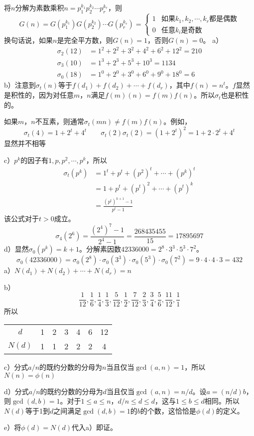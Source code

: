 将$n$分解为素数乘积$n=p_1^{k_1}p_2^{k_2}\cdots p_r^{k_r}$，则
\[G(n)=G(p_1^{k_1})G(p_2^{k_2})\cdots G(p_r^{k_r})=
\begin{cases}  
1 & \text{如果$k_1,k_2,\cdots,k_r$都是偶数} \\
0 & \text{任意$k_i$是奇数}
\end{cases}\]
换句话说，如果$n$是完全平方数，则$G(n)=1$，否则$G(n)=0$。
%
\exercise a）
\begin{align*}
\sigma_2(12)&=1^2+2^2+3^2+4^2+6^2+12^2=210\\
\sigma_3(10)&=1^3+2^3+5^3+10^3=1134\\
\sigma_0(18)&=1^0+2^0+3^0+6^0+9^0+18^0=6
\end{align*}
b）注意到$\sigma_t(n)$等于$f(d_1)+f(d_2)+\cdots+f(d_r)$，其中$f(n)=n^t$。$f$显然是积性的，因为对任意$m$，$n$满足$f(m)(n)=f(m)f(n)$。所以$\sigma_t$也是积性的。\par
如果$m$，$n$不互素，则通常$\sigma_t(mn)\not=f(m)f(n)$。例如，
\[\sigma_t(4)=1+2^t+4^t\qquad \sigma_t(2)\sigma_t(2)=(1+2^t)^2=1+2\cdot2^t+4^t\]
显然并不相等\par
c）$p^k$的因子有$1,p,p^2,\cdots,p^k$，所以
\begin{align*}
\sigma_t(p^k)&=1^t+p^t+(p^2)^t+\cdots+(p^k)^t \\
&=1+p^t+(p^t)^2+\cdots+(p^t)^k\\
&=\frac{(p^t)^{k+1}-1}{p^t-1}
\end{align*}
该公式对于$t>0$成立。
\[\sigma_4(2^6)=\frac{(2^4)^7-1}{2^4-1}=\frac{268435455}{15}=17895697\]
d）显然$\sigma_0(p^k)=k+1$。分解素因数$42336000=2^8\cdot3^3\cdot5^3\cdot7^2$。
\[\sigma_0(42336000)=\sigma_0(2^8)\cdot\sigma_0(3^3)\cdot\sigma_0(5^3)\cdot\sigma_0(7^2)=9\cdot4\cdot4\cdot3=432\]
%
\exercise a）$N(d_1)+N(d_2)+\cdots+N(d_r)=n$\par
b）\[\frac{1}{12},\frac{1}{6},\frac{1}{4},\frac{1}{3},\frac{5}{12},\frac{1}{2},\frac{7}{12},\frac{2}{3},\frac{3}{4},\frac{5}{6},\frac{11}{12},\frac{1}{1}\]
所以
\begin{center}
\begin{tabular}{|*{7}{c|}}
$d$ & 1 & 2 & 3 & 4 & 6 & 12 \\
$N(d)$ & 1 & 1 & 2 & 2 & 2 & 4 \\
\end{tabular}
\end{center}
c）分式$a/n$的既约分数的分母为$n$当且仅当$\gcd(a, n)=1$，所以$N(n)=\phi(n)$\par
d）分式$a/n$的既约分数的分母为$d$当且仅当$\gcd(a,n)=n/d$。设$a=(n/d)b$，则$\gcd(d, b)=1$。对于$1\le a\le n$，$d/n\le d\le d$，这与$1\le b\le d$相同。所以$N(d)$等于1到$d$之间满足$\gcd(d, b)=1$的$b$的个数，这恰恰是$\phi(d)$的定义。\par
e）将$\phi(d)=N(d)$代入a）即证。